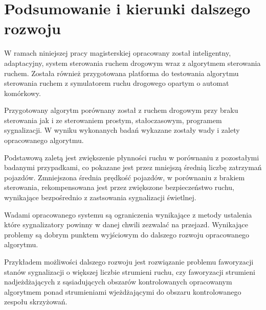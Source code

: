 \chapter{Podsumowanie i kierunki dalszego rozwoju}
W ramach niniejszej pracy magisterskiej opracowany został inteligentny, adaptacyjny, system sterowania ruchem drogowym wraz z algorytmem sterowania ruchem. Została również przygotowana platforma do testowania algorytmu sterowania ruchem z symulatorem ruchu drogowego opartym o automat komórkowy.

Przygotowany algorytm porównany został z ruchem drogowym przy braku sterowania jak i ze sterowaniem prostym, stałoczasowym, programem sygnalizacji. W wyniku wykonanych badań wykazane zostały wady i zalety opracowanego algorytmu.

Podstawową zaletą jest zwiększenie płynności ruchu w porównaniu z pozostałymi badanymi przypadkami, co pokazane jest przez mniejszą średnią liczbę zatrzymań pojazdów. Zmniejszona średnia prędkość pojazdów, w porównaniu z brakiem sterowania, rekompensowana jest przez zwiększone bezpieczeństwo ruchu, wynikające bezpośrednio z zastsowania sygnalizacji świetlnej.

Wadami opracowanego systemu są ograniczenia wynikające z metody ustalenia które sygnalizatory powinny w danej chwili zezwalać na przejazd. Wynikające problemy są dobrym punktem wyjściowym do dalszego rozwoju opracowanego algorytmu.

Przykładem możliwości dalszego rozwoju jest rozwiązanie problemu faworyzacji stanów sygnalizacji o większej liczbie strumieni ruchu, czy faworyzacji strumieni nadjeżdżających z sąsiadujących obszarów kontrolowanych opracowanym algorytmem ponad strumieniami wjeżdżającymi do obszaru kontrolowanego zespołu skrzyżowań.